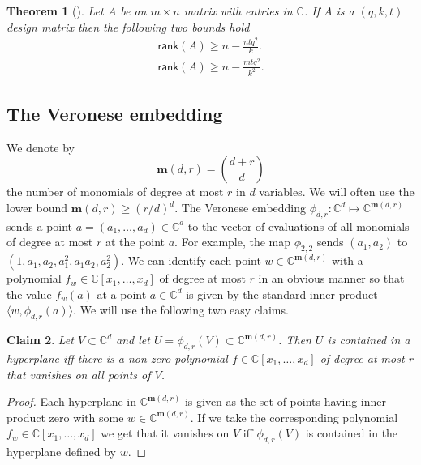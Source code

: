 \documentclass[11pt]{article}
\newtheorem{thm}{Theorem}[section]
\newtheorem{claim}[thm]{Claim}
\def\C{{\mathbb{C}}}
\def\m{{\mathbf{m}}}
\newcommand{\ip}[2]{\langle #1,#2 \rangle}
\def\rank{\textsf{rank}}
\begin{document}
\begin{thm}[\cite{DSW12}]\label{thm-rankbound}
Let $A$ be an $m \times n$ matrix with entries in $\C$. If $A$ is a $(q,k,t)$ design matrix then the following two bounds hold
\begin{eqnarray}
\rank(A) \geq n - \frac{ntq^2}{k}.\label{eq-rank1}\\
\rank(A) \geq n - \frac{mtq^2}{k^2}.\label{eq-rank2}
\end{eqnarray}



\end{thm}


\subsection{The Veronese embedding}
\label{sec-veronese-embedding}

We denote by $$\m(d,r) = \binom{d+r}{d}$$ the number of monomials of degree at most $r$ in $d$ variables. We will often use the lower bound $\m(d,r) \geq (r/d)^d$.
 The Veronese embedding $\phi_{d,r} : \C^d \mapsto \C^{\m(d,r)}$ sends a point $a = (a_1,\ldots,a_d) \in \C^d$ to the vector of evaluations of all monomials of degree at most $r$ at the point $a$. For example, the map $\phi_{2,2}$ sends $(a_1,a_2)$ to $(1,a_1,a_2,a_1^2,a_1a_2,a_2^2)$. 
 We can identify each point $w \in \C^{\m(d,r)}$ with a polynomial $f_w \in \C[x_1,\ldots,x_d]$ of degree at most $r$ in an obvious manner so that the value $f_w(a)$ at a point $a \in \C^d$ is given by the standard inner product $\ip{w}{\phi_{d,r}(a)}$. We will use the following two easy claims.

\begin{claim}\label{cla-veronese-vanish}
Let  $V \subset \C^d$ and let $U = \phi_{d,r}(V) \subset \C^{\m(d,r)}$. Then  $U$ is contained in a hyperplane iff there is a non-zero polynomial $f \in \C[x_1,\ldots,x_d]$ of degree at most $r$ that vanishes on all points of $V$.
\end{claim}
\begin{proof}
Each hyperplane in $\C^{\m(d,r)}$ is given as the set of points having inner product zero with some  $w \in \C^{\m(d,r)}$. If we take the corresponding polynomial $f_w \in \C[x_1,\ldots,x_d]$ we get that it vanishes on $V$ iff $\phi_{d,r}(V)$ is contained in the hyperplane defined by $w$. 
\end{proof}
\end{document}
